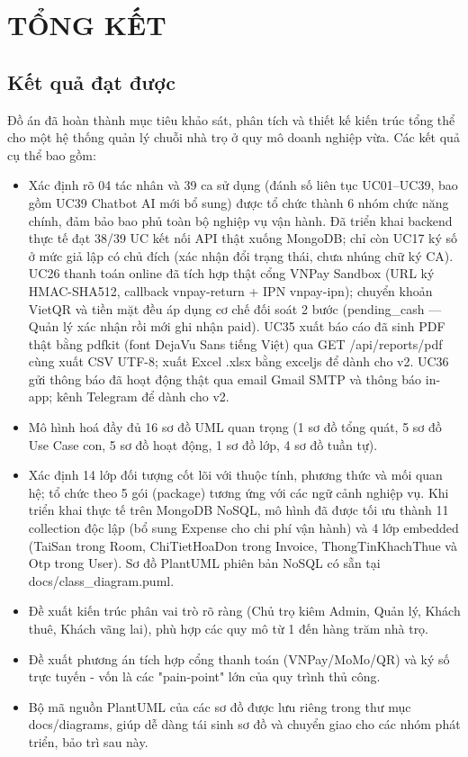 \chapter{TỔNG KẾT}

\section{Kết quả đạt được}

Đồ án đã hoàn thành mục tiêu khảo sát, phân tích và thiết kế kiến trúc
tổng thể cho một hệ thống quản lý chuỗi nhà trọ ở quy mô doanh nghiệp
vừa. Các kết quả cụ thể bao gồm:

\begin{itemize}
\item
  Xác định rõ 04 tác nhân và 39 ca sử dụng (đánh số liên tục UC01--UC39,
  bao gồm UC39 Chatbot AI mới bổ sung) được tổ chức thành 6 nhóm chức
  năng chính, đảm bảo bao phủ toàn bộ nghiệp vụ vận hành. Đã triển khai
  backend thực tế đạt 38/39 UC kết nối API thật xuống MongoDB; chỉ còn
  UC17 ký số ở mức giả lập có chủ đích (xác nhận đổi trạng thái, chưa
  nhúng chữ ký CA). UC26 thanh toán online đã tích hợp thật cổng VNPay
  Sandbox (URL ký HMAC-SHA512, callback vnpay-return + IPN vnpay-ipn);
  chuyển khoản VietQR và tiền mặt đều áp dụng cơ chế đối soát 2 bước
  (pending\_cash --- Quản lý xác nhận rồi mới ghi nhận paid). UC35 xuất
  báo cáo đã sinh PDF thật bằng pdfkit (font DejaVu Sans tiếng Việt) qua
  GET /api/reports/pdf cùng xuất CSV UTF-8; xuất Excel .xlsx bằng
  exceljs để dành cho v2. UC36 gửi thông báo đã hoạt động thật qua email
  Gmail SMTP và thông báo in-app; kênh Telegram để dành cho v2.
\item
  Mô hình hoá đầy đủ 16 sơ đồ UML quan trọng (1 sơ đồ tổng quát, 5 sơ đồ
  Use Case con, 5 sơ đồ hoạt động, 1 sơ đồ lớp, 4 sơ đồ tuần tự).
\item
  Xác định 14 lớp đối tượng cốt lõi với thuộc tính, phương thức và mối
  quan hệ; tổ chức theo 5 gói (package) tương ứng với các ngữ cảnh
  nghiệp vụ. Khi triển khai thực tế trên MongoDB NoSQL, mô hình đã được
  tối ưu thành 11 collection độc lập (bổ sung Expense cho chi phí vận
  hành) và 4 lớp embedded (TaiSan trong Room, ChiTietHoaDon trong
  Invoice, ThongTinKhachThue và Otp trong User). Sơ đồ PlantUML phiên
  bản NoSQL có sẵn tại docs/class\_diagram.puml.
\item
  Đề xuất kiến trúc phân vai trò rõ ràng (Chủ trọ kiêm Admin, Quản lý,
  Khách thuê, Khách vãng lai), phù hợp các quy mô từ 1 đến hàng trăm nhà
  trọ.
\item
  Đề xuất phương án tích hợp cổng thanh toán (VNPay/MoMo/QR) và ký số
  trực tuyến - vốn là các "pain-point" lớn của quy trình thủ công.
\item
  Bộ mã nguồn PlantUML của các sơ đồ được lưu riêng trong thư mục
  docs/diagrams, giúp dễ dàng tái sinh sơ đồ và chuyển giao cho các nhóm
  phát triển, bảo trì sau này.
\end{itemize}

